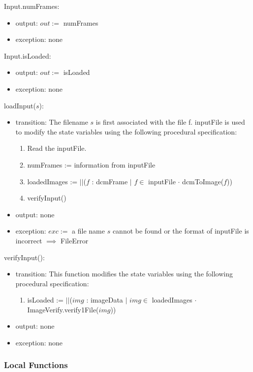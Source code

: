 \documentclass[12pt, titlepage]{article}
\begin{document}
\noindent Input.numFrames:
\begin{itemize}
\item output: $out:=$ numFrames 
\item exception: none 
\end{itemize}

\noindent Input.isLoaded:
\begin{itemize}
\item output: $out:=$ isLoaded 
\item exception: none 
\end{itemize}

\noindent loadInput($s$):
\begin{itemize}
\item transition: 
The filename $s$ is first associated with the file f. inputFile is used to
modify
the state variables using the following procedural specification:
\begin{enumerate}
    \item Read the inputFile.
    \item
    numFrames := information from inputFile
    \item
loadedImages := $||$($f$ : dcmFrame $|$ $f \in $ inputFile $\cdot$
dcmToImage($f$))
    \item
    verifyInput()
\end{enumerate}
\item output: none
\item exception: $exc :=$ a file name $s$ cannot be found or the format of
inputFile is incorrect
$\implies$ FileError
\end{itemize}

\noindent verifyInput():
\begin{itemize}
\item transition: 
This function modifies the state variables using the following procedural
specification:
\begin{enumerate}
    \item
isLoaded := $||$($img$ : imageData $|$ $img \in$ loadedImages $\cdot$
ImageVerify.verify1File($img$))
\end{enumerate}
\item output: none 
\item exception: none
\end{itemize}

\subsubsection{Local Functions}
\end{document}
